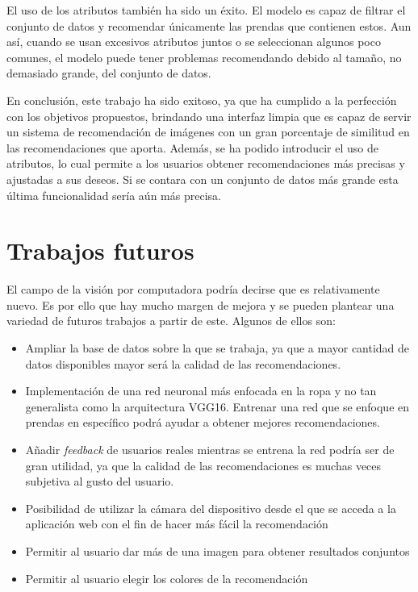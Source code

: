 \documentclass[12pt]{report} %
\begin{document}
	El uso de los atributos también ha sido un éxito. El modelo es capaz de filtrar el conjunto de datos y recomendar únicamente las prendas
	que contienen estos. Aun así, cuando se usan excesivos atributos juntos o se seleccionan algunos poco comunes, el modelo puede tener problemas
	recomendando debido al tamaño, no demasiado grande, del conjunto de datos.

	En conclusión, este trabajo ha sido exitoso, ya que ha cumplido a la perfección con los objetivos propuestos, brindando una interfaz limpia que es capaz
	de servir un sistema de recomendación de imágenes con un gran porcentaje de similitud en las recomendaciones que aporta. Además, se ha podido introducir el uso de
	atributos, lo cual permite a los usuarios obtener recomendaciones más precisas y ajustadas a sus deseos. Si se contara con un conjunto de
	datos más grande esta última funcionalidad sería aún más precisa.

	\chapter{Trabajos futuros}
	
	El campo de la visión por computadora podría decirse que es relativamente nuevo. Es por ello que hay mucho margen de mejora y se pueden plantear
	una variedad de futuros trabajos a partir de este. Algunos de ellos son:
	\begin{itemize}
		\item Ampliar la base de datos sobre la que se trabaja, ya que a mayor cantidad de datos disponibles mayor será la calidad de las recomendaciones.
		\item Implementación de una red neuronal más enfocada en la ropa y no tan generalista como la arquitectura VGG16. Entrenar una red que se enfoque en
		prendas en específico podrá ayudar a obtener mejores recomendaciones.
		\item Añadir \textit{feedback} de usuarios reales mientras se entrena la red podría ser de gran utilidad, ya que la calidad de las recomendaciones es muchas veces
		subjetiva al gusto del usuario.
		\item Posibilidad de utilizar la cámara del dispositivo desde el que se acceda a la aplicación web con el fin de hacer más fácil la recomendación
		\item Permitir al usuario dar más de una imagen para obtener resultados conjuntos
		\item Permitir al usuario elegir los colores de la recomendación
	\end{itemize}
\end{document}
